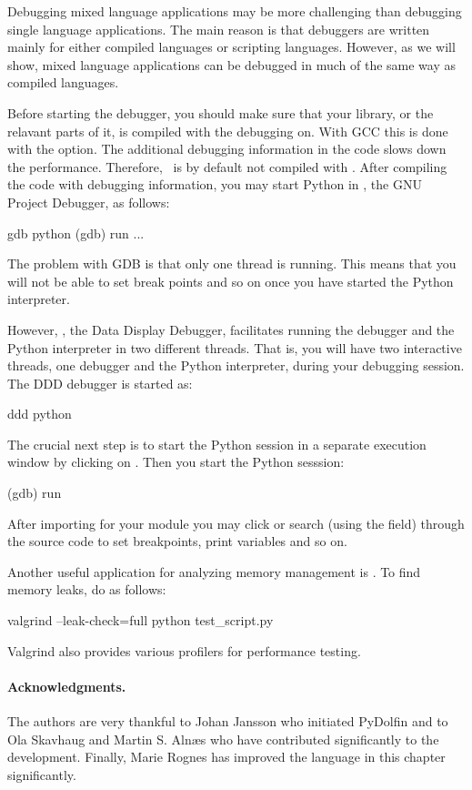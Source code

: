 Debugging mixed language applications may be more challenging than debugging
single language applications.  The main reason is that debuggers are written
mainly for either compiled languages or scripting languages. However, as
we will show, mixed language applications can be debugged in much of the same way
as compiled languages. 

Before starting the debugger, you should make sure that your library, 
or the relavant parts of it, 
is compiled with the debugging on. With GCC this is done with the 
option. The additional debugging information in the code slows down 
the performance. Therefore, \dolfin\ is by default not compiled with
.   
After compiling the code with debugging information, you may start 
Python in \citet{www:gdb}, the GNU Project Debugger, as follows:     
\begin{c++}
gdb python
(gdb) run
...
\end{c++}
The problem with GDB is that only one thread is running. This means that
you will not be able to set break points and so on once you have started
the Python interpreter.  

However, \citet{www:ddd}, the Data Display Debugger, facilitates running the debugger and the Python
interpreter in two different threads. That is, you will have two interactive
threads, one debugger and the Python interpreter,  during your debugging
session. The DDD debugger is started as:    
\begin{c++}
ddd python
\end{c++}
The crucial next step is to start the Python session in a separate
execution window by clicking on . 
Then you start the Python sesssion: 
\begin{c++}
(gdb) run
\end{c++}
After importing for your module you may click or search (using the
 field)  through the  source code  
to  set breakpoints, print variables and so on. 

Another useful application for analyzing memory management is
\citet{www:valgrind}. To find memory leaks, do as follows:    
\begin{bash}
valgrind --leak-check=full python test_script.py
\end{bash}
Valgrind also provides various profilers for performance testing. 

\paragraph{Acknowledgments.}
The authors are very thankful to Johan Jansson who initiated PyDolfin and 
to Ola Skavhaug and Martin S. Aln\ae s who have contributed significantly to
the development.
Finally, Marie Rognes has improved the language in this chapter significantly. 

